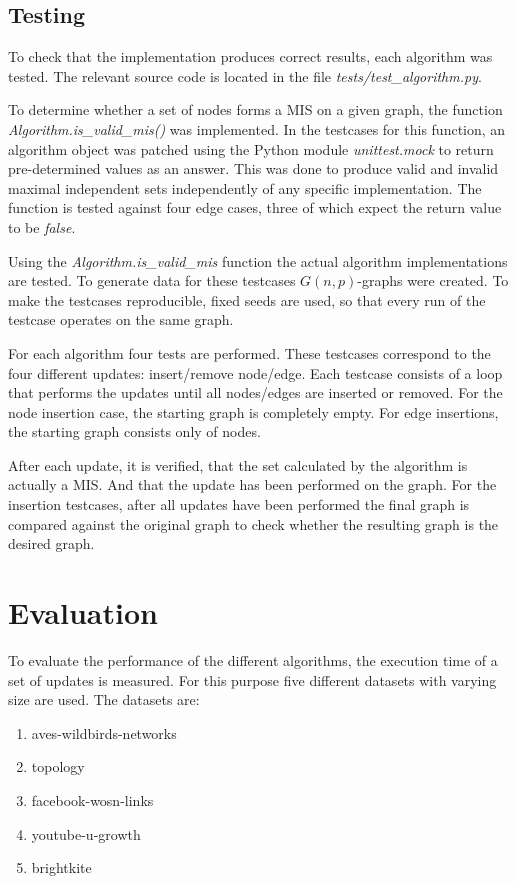 \documentclass[letterpaper,12pt]{article}
\begin{document}
\subsection{Testing}
To check that the implementation produces correct results, each algorithm was tested.
The relevant source code is located in the file \textit{tests/test\_algorithm.py}.

To determine whether a set of nodes forms a MIS on a given graph, the function
\textit{Algorithm.is\_valid\_mis()} was implemented.  In the testcases for this
function, an algorithm object was patched using the Python module
\textit{unittest.mock} to return pre-determined values as an answer.
This was done to produce valid and invalid maximal independent sets independently of 
any specific implementation.
The function is tested against four edge cases, three of which expect the
return value to be \textit{false}.

\bigskip

Using the \textit{Algorithm.is\_valid\_mis} function the actual algorithm
implementations are tested.  To generate data for these testcases $G(n,
p)$-graphs were created. To make the testcases reproducible, fixed seeds are
used, so that every run of the testcase operates on the same graph.

For each algorithm four tests are performed.  These testcases correspond to the
four different updates: insert/remove node/edge.  Each testcase consists of a
loop that performs the updates until all nodes/edges are inserted or removed.
For the node insertion case, the starting graph is completely empty. For edge
insertions, the starting graph consists only of nodes.

After each update, it is verified, that the set calculated by the algorithm is
actually a MIS. And that the update has been performed on the graph.  For the
insertion testcases, after all updates have been performed the final graph is
compared against the original graph to check whether the resulting graph is the
desired graph.


\section{Evaluation}

To evaluate the performance of the different algorithms, the execution time of
a set of updates is measured. 
For this purpose five different datasets with varying size are used. 
The datasets are:

\begin{enumerate}
  \itemsep 0em
  \item aves-wildbirds-networks \cite{wildbirds}
  \item topology \cite{konect:2016:topology, konect:zhang05, konect}
  \item facebook-wosn-links \cite{konect:2016:facebook-wosn-links, viswanath09, konect}
  \item youtube-u-growth \cite{konect:2016:youtube-u-growth, konect:mislove2, konect}
  \item brightkite \cite{konect:2016:loc-brightkite_edges, konect:cho2011, konect}
\end{enumerate}
\end{document}
